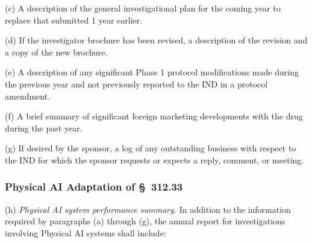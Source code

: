 (c) A description of the general investigational plan for the coming year to replace that submitted 1 year earlier.

(d) If the investigator brochure has been revised, a description of the revision and a copy of the new brochure.

(e) A description of any significant Phase 1 protocol modifications made during the previous year and not previously reported to the IND in a protocol amendment.

(f) A brief summary of significant foreign marketing developments with the drug during the past year.

(g) If desired by the sponsor, a log of any outstanding business with respect to the IND for which the sponsor requests or expects a reply, comment, or meeting.

\subsubsection{Physical AI Adaptation of \S~312.33}

(h) \textit{Physical AI system performance summary.} In addition to the information required by paragraphs (a) through (g), the annual report for investigations involving Physical AI systems shall include:

